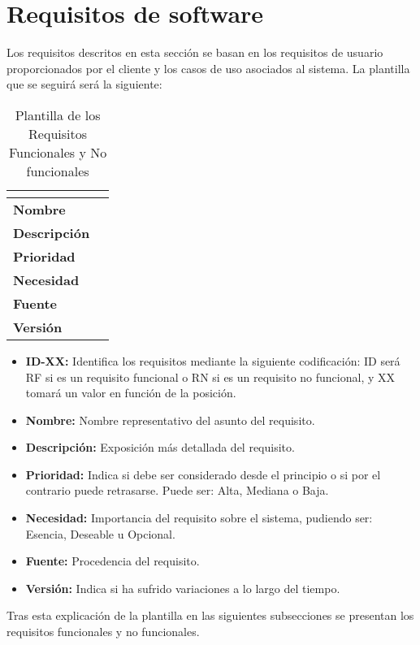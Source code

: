 \section{Requisitos de software}
Los requisitos descritos en esta sección se basan en los requisitos de usuario proporcionados por el cliente y los casos de uso asociados al sistema. La plantilla que se seguirá será la siguiente:
\begin{table}[H]
	\caption{Plantilla de los Requisitos Funcionales y No funcionales}
	\begin{tabular}{|l|p{}|}
		\hline
		\multicolumn{2}{|c|}{\cellcolor[HTML]{BFBFBF}{\color[HTML]{000000} \textbf{ID-XX}}} \\ \hline
		\textbf{Nombre}      &   \\ \hline
		\textbf{Descripción} &   \\ \hline
		\textbf{Prioridad}   &   \\ \hline
		\textbf{Necesidad}   &   \\ \hline
		\textbf{Fuente}      &   \\ \hline
		\textbf{Versión}     &   \\ \hline
	\end{tabular}
\end{table}
\begin{itemize}
	\item \textbf{ID-XX:} Identifica los requisitos mediante la siguiente codificación: ID será RF si es un requisito funcional o RN si es un requisito no funcional, y XX tomará un valor en función de la posición.
	\item \textbf{Nombre:} Nombre representativo del asunto del requisito.
	\item \textbf{Descripción:} Exposición más detallada del requisito.
	\item \textbf{Prioridad:} Indica si debe ser considerado desde el principio o si por el contrario puede retrasarse. Puede ser: Alta, Mediana o Baja.
	\item \textbf{Necesidad:} Importancia del requisito sobre el sistema, pudiendo ser: Esencia, Deseable u Opcional.
	\item \textbf{Fuente:} Procedencia del requisito.
	\item \textbf{Versión:} Indica si ha sufrido variaciones a lo largo del tiempo.
\end{itemize}

Tras esta explicación de la plantilla en las siguientes subsecciones se presentan los requisitos funcionales y no funcionales.
